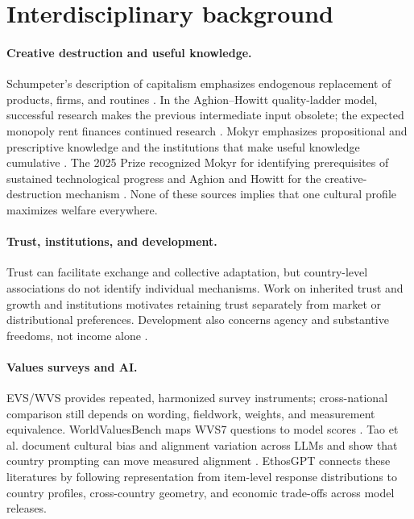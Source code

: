 \section{Interdisciplinary background}

\paragraph{Creative destruction and useful knowledge.}
Schumpeter's description of capitalism emphasizes endogenous replacement of products, firms, and routines \citep{schumpeter1942capitalism}. In the Aghion--Howitt quality-ladder model, successful research makes the previous intermediate input obsolete; the expected monopoly rent finances continued research \citep{aghion1992model}. Mokyr emphasizes propositional and prescriptive knowledge and the institutions that make useful knowledge cumulative \citep{mokyr2002gifts}. The 2025 Prize recognized Mokyr for identifying prerequisites of sustained technological progress and Aghion and Howitt for the creative-destruction mechanism \citep{nobel2025}. None of these sources implies that one cultural profile maximizes welfare everywhere.

\paragraph{Trust, institutions, and development.}
Trust can facilitate exchange and collective adaptation, but country-level associations do not identify individual mechanisms. Work on inherited trust and growth \citep{algan2010inherited} and institutions \citep{acemoglu2001colonial} motivates retaining trust separately from market or distributional preferences. Development also concerns agency and substantive freedoms, not income alone \citep{sen1999development}.

\paragraph{Values surveys and AI.}
EVS/WVS provides repeated, harmonized survey instruments; cross-national comparison still depends on wording, fieldwork, weights, and measurement equivalence. WorldValuesBench maps WVS7 questions to model scores \citep{zhao2024worldvaluesbench}. Tao et al. document cultural bias and alignment variation across LLMs and show that country prompting can move measured alignment \citep{tao2024cultural}. EthosGPT connects these literatures by following representation from item-level response distributions to country profiles, cross-country geometry, and economic trade-offs across model releases.

